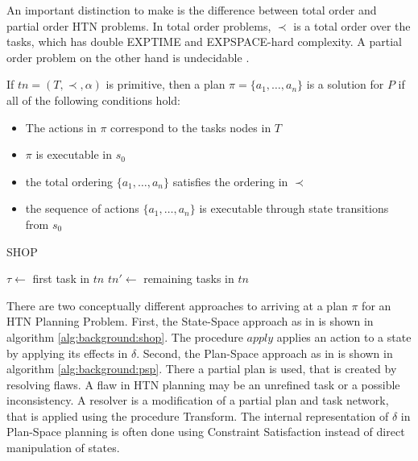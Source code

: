An important distinction to make is the difference between total order and partial order HTN problems.
In total order problems, $\prec$ is a total order over the tasks, which has double EXPTIME and EXPSPACE-hard complexity.
A partial order problem on the other hand is undecidable \citep{erolHTNPlanningComplexity1994}.


\begin{definition}
  If $tn = (T,\prec,\alpha)$ is primitive, then a plan $\pi = \{a_1,\dots,a_n\}$ is a solution for $P$ if all of the following conditions hold:
  \begin{itemize}
    \item The actions in $\pi$ correspond to the tasks nodes in $T$
    \item $\pi$ is executable in $s_0$
    \item the total ordering $\{a_1,\dots,a_n\}$ satisfies the ordering in $\prec$
    \item the sequence of actions $\{a_1,\dots,a_n\}$ is executable through state transitions from $s_0$
  \end{itemize}
\end{definition}

\begin{algorithm}
  \caption{SHOP}
  \label{alg:background:shop}
  \KwOut{$\pi$}
  $\tau \leftarrow$ first task in $tn$\;
  $tn' \leftarrow$ remaining tasks in $tn$\;
\end{algorithm}

There are two conceptually different approaches to arriving at a plan $\pi$ for an HTN Planning Problem. 
First, the State-Space approach as in \cite{nauSHOPSimpleHierarchical1999} is shown in algorithm \ref{alg:background:shop}.
The procedure $apply$ applies an action to a state by applying its effects in $\delta$.
Second, the Plan-Space approach as in \citet[sec.~5.4.1]{ghallabAutomatedPlanningTheory2004} is shown in algorithm \ref{alg:background:psp}.
There a partial plan is used, that is created by resolving flaws.
A flaw in HTN planning may be an unrefined task or a possible inconsistency.
A resolver is a modification of a partial plan and task network, that is applied using the procedure Transform.
The internal representation of $\delta$ in Plan-Space planning is often done using Constraint Satisfaction instead of direct manipulation of states.

